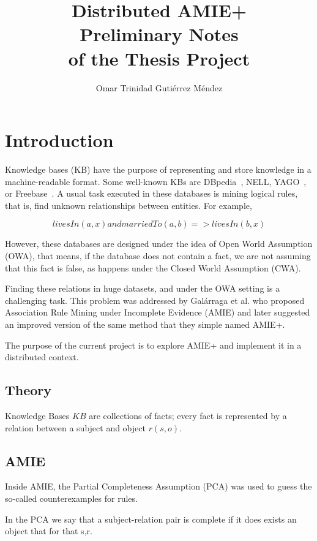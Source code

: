 \documentclass{article}
\title{
Distributed AMIE+\\
\large Preliminary Notes\\
of the Thesis Project\\
}
\author{Omar Trinidad Guti\'errez M\'endez}
\begin{document}
\maketitle

\section{Introduction}

Knowledge bases (KB) have the purpose of representing and store knowledge in a
machine-readable format. Some well-known KBs are DBpedia~\cite{dbpedia-swj},
NELL, YAGO~\cite{suchanek2007yago}, or Freebase~\cite{bollacker2008freebase}. A
usual task executed in these databases is mining logical rules, that is, find
unknown relationships between entities. For example,

\begin{equation*}
livesIn(a, x) and marriedTo(a, b) => livesIn(b, x)
\end{equation*}

However,  these databases are designed under the idea of Open World Assumption
(OWA), that means, if the database does not contain a fact, we are not assuming
that this fact is false, as happens under the Closed World Assumption (CWA).

Finding these relations in huge datasets, and under the OWA setting is a
challenging task. This problem was addressed by Galárraga et al. who proposed
Association Rule Mining under Incomplete Evidence (AMIE) and later suggested an
improved version of the same method that they simple named AMIE+.

The purpose of the current project is to explore AMIE+ and implement it in a
distributed context.

\subsection{Theory}

Knowledge Bases $KB$ are collections of facts; every fact is represented by a
relation between a subject and object $r(s, o)$.

\subsection{AMIE}

Inside AMIE, the Partial Completeness Assumption (PCA) was used to guess the
so-called counterexamples for rules. 


In the PCA we say that a subject-relation pair is complete if it does exists
an object that for that s,r.
\end{document}
